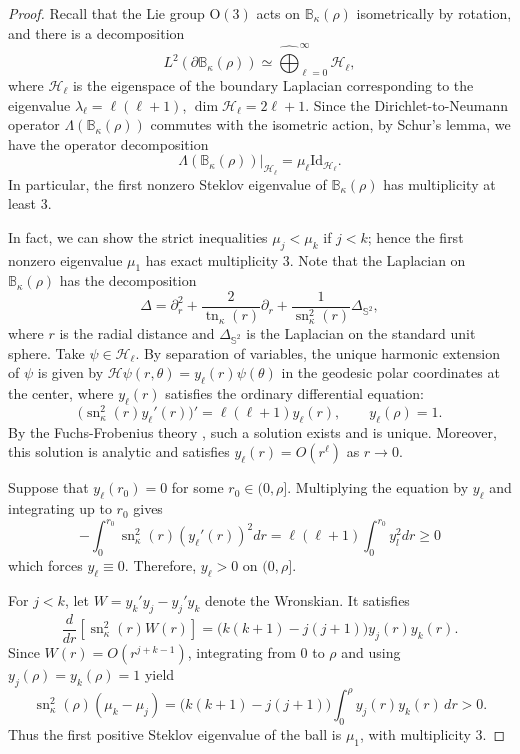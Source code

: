 \documentclass[11pt]{amsart}
\newcommand*{\Id}{\mathrm{Id}}
\newcommand{\Ogroup}[1]{\mathrm O({#1})}
\newcommand{\sn}{\operatorname{sn}}
\newcommand{\tn}{\operatorname{tn}}
\theoremstyle{definition}
\numberwithin{equation}{section}
\begin{document}
\begin{proof}
    Recall that the Lie group $\Ogroup{3}$ acts on $\mathbb B_\kappa(\rho)$ isometrically by rotation, and there is a decomposition 
    \[L^2(\partial\mathbb B_\kappa(\rho))\simeq\widehat\bigoplus_{\ell=0}^\infty\mathcal H_\ell,\]
    where $\mathcal H_\ell$ is the eigenspace of the boundary Laplacian corresponding to the eigenvalue $\lambda_\ell=\ell(\ell+1)$, $\dim\mathcal H_\ell = 2\ell+1$. Since the Dirichlet-to-Neumann operator $\Lambda(\mathbb B_\kappa(\rho))$ commutes with the isometric action, by Schur's lemma, we have the operator decomposition
    \[\Lambda(\mathbb B_\kappa(\rho))|_{\mathcal H_\ell} = \mu_\ell \Id_{\mathcal H_\ell}.\]
    In particular, the first nonzero Steklov eigenvalue of $\mathbb B_\kappa(\rho)$ has multiplicity at least $3$.

    In fact, we can show the strict inequalities $\mu_j<\mu_k$ if $j<k$; hence the first nonzero eigenvalue $\mu_1$ has exact multiplicity $3$. Note that the Laplacian on $\mathbb B_\kappa(\rho)$ has the decomposition
    \[\Delta = \partial_r^2 + \frac{2}{\tn_\kappa(r)}\partial_r + \frac{1}{\sn_\kappa^2(r)}\Delta_{\mathbb S^2},\]
    where $r$ is the radial distance and $\Delta_{\mathbb S^2}$ is the Laplacian on the standard unit sphere. Take $\psi\in\mathcal H_\ell$. By separation of variables, the unique harmonic extension of $\psi$ is given by $\mathcal H\psi(r,\theta) = y_\ell(r)\psi(\theta)$ in the geodesic polar coordinates at the center, where $y_\ell(r)$ satisfies the ordinary differential equation:
    \[\bigl(\sn_\kappa^2(r)y_\ell'(r)\bigr)'
=\ell(\ell+1)y_\ell(r),\qquad y_\ell(\rho) = 1.\]
    By the Fuchs-Frobenius theory \cite[Theorem 4.1]{olver1997asymptotics}, such a solution exists and is unique. Moreover, this solution is analytic and satisfies $y_\ell(r) = O(r^\ell)$ as $r\to 0$.
         
    Suppose that $y_\ell(r_0) = 0$ for some $r_0\in(0,\rho]$. Multiplying the equation by $y_\ell$ and integrating up to $r_0$ gives
    \[-\int_0^{r_0}\sn_\kappa^2(r)\left(y_\ell'(r)\right)^2dr = \ell(\ell+1)\int_0^{r_0}y_l^2dr\ge 0\]
    which forces $y_\ell\equiv0$. Therefore, $y_\ell > 0$ on $(0,\rho]$.
    
    For $j<k$, let $W = y_k'y_j-y_j'y_k$ denote the Wronskian. It satisfies
\[
\frac{d}{dr}\left[
\sn_\kappa^2(r)W(r)
\right]
=\bigl(k(k+1)-j(j+1)\bigr)y_j(r)y_k(r).
\]
Since $W(r) = O(r^{j+k-1})$, integrating from $0$ to $\rho$ and using
$y_j(\rho)=y_k(\rho)=1$ yield
\[
\sn_\kappa^2(\rho)(\mu_k-\mu_j)
=\bigl(k(k+1)-j(j+1)\bigr)
\int_0^\rho y_j(r)y_k(r)\,dr>0.
\]
Thus the first positive Steklov eigenvalue of the ball is $\mu_1$, with multiplicity $3$.




\end{proof}
\end{document}
